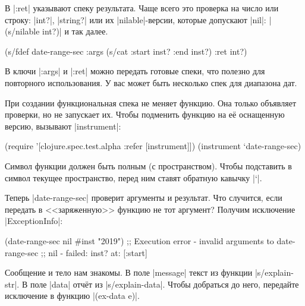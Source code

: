 В \spverb|:ret| указывают спеку результата. Чаще всего это проверка на число или
строку: \spverb|int?|, \spverb|string?| или их \spverb|nilable|-версии, которые
допускают \spverb|nil|: \spverb|(s/nilable int?)| и так далее.


\begin{english}
  \begin{clojure}
(s/fdef date-range-sec
  :args (s/cat :start inst? :end inst?)
  :ret int?)
  \end{clojure}
\end{english}

В ключи \spverb|:args| и \spverb|:ret| можно передать готовые спеки, что полезно
для повторного использования. У вас может быть несколько спек для диапазона дат.

При создании функциональная спека не меняет функцию. Она только объявляет
проверки, но не запускает их. Чтобы подменить функцию на е\"{е} оснащенную версию,
вызывают \spverb|instrument|:

\begin{english}
  \begin{clojure}
(require '[clojure.spec.test.alpha :refer [instrument]])
(instrument `date-range-sec)
  \end{clojure}
\end{english}


Символ функции должен быть полным (с пространством). Чтобы подставить в символ
текущее пространство, перед ним ставят обратную кавычку \spverb|`|.

Теперь \spverb|date-range-sec| проверит аргументы и результат. Что случится,
если передать в <<заряженную>> функцию не тот аргумент? Получим исключение
\spverb|ExceptionInfo|:

\begin{english}
  \begin{clojure}
(date-range-sec nil #inst "2019")
;; Execution error - invalid arguments to date-range-sec
;; nil - failed: inst? at: [:start]
  \end{clojure}
\end{english}


Сообщение и тело нам знакомы. В поле \spverb|message| текст из функции
\spverb|s/explain-str|. В поле \spverb|data| отч\"{е}т из
\spverb|s/explain-data|. Чтобы добраться до него, передайте исключение в функцию
\spverb|(ex-data e)|.

